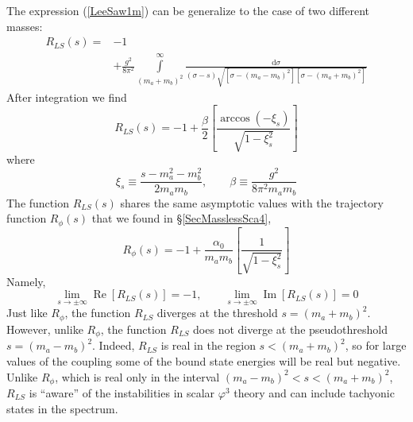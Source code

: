 The expression (\ref{LeeSaw1m}) can be generalize to the case of two different masses:
\begin{equation}
\begin{split}
	R_{LS}(s) = {}& {-1} \\
	&+ \frac{g^{2}}{8 \pi^{2}} \int\limits_{(m_{a} + m_{b})^{2}}^{\infty} \frac{\mathrm{d}\sigma}{(\sigma - s) \sqrt{[\sigma - (m_{a} - m_{b})^{2}][\sigma - (m_{a} + m_{b})^{2}]}}
\end{split}
\end{equation}
After integration we find
\begin{equation}
	R_{LS}(s) = -1 + \frac{\beta}{2} \left[ \frac{\arccos{\left(-\xi_{s} \right)}}{\sqrt{1 - \xi^{2}_{s}}} \right]
\end{equation}
where
\begin{equation}
	\xi_{s} \equiv \frac{s - m_{a}^{2} - m_{b}^{2}}{2 m_{a} m_{b}}, \qquad \beta \equiv \frac{g^{2}}{8 \pi^{2} m_{a} m_{b}}
\end{equation}
The function $R_{LS}(s)$ shares the same asymptotic values with the trajectory function $R_{\phi}(s)$ that we found in \S\ref{SecMasslessSca4},
\begin{equation}
	R_{\phi}(s) = -1 + \frac{\alpha_{0}}{m_{a} m_{b}} \left[ \frac{1}{\sqrt{1 - \xi^{2}_{s}}} \right]
\end{equation}
Namely,
\begin{equation}
	\lim_{s \rightarrow \pm \infty} \operatorname{Re}{[R_{LS}(s)]} = -1, \qquad \lim_{s \rightarrow \pm \infty} \operatorname{Im}{[R_{LS}(s)]} = 0
\end{equation}
Just like $R_{\phi}$, the function $R_{LS}$ diverges at the threshold $s = (m_{a} + m_{b})^{2}$. However, unlike $R_{\phi}$, the function $R_{LS}$ does not diverge at the pseudothreshold $s = (m_{a} - m_{b})^{2}$. Indeed, $R_{LS}$ is real in the region $s < (m_{a} + m_{b})^{2}$, so for large values of the coupling some of the bound state energies will be real but negative. Unlike $R_{\phi}$, which is real only in the interval $(m_{a} - m_{b})^{2} < s < (m_{a} + m_{b})^{2}$, $R_{LS}$ is ``aware'' of the instabilities in scalar $\varphi^{3}$ theory and can include tachyonic states in the spectrum.

